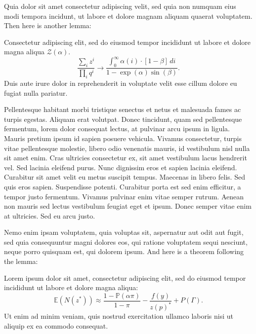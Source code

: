 \documentclass[letterpaper,11pt,leqno]{article}
\begin{document}
Quia dolor sit amet consectetur adipiscing velit, sed quia non numquam eius modi tempora incidunt, ut labore et dolore magnam aliquam quaerat voluptatem. Then here is another lemma:
\begin{lemma}
Consectetur adipiscing elit, sed do eiusmod tempor incididunt ut labore et dolore magna aliqua $\mathcal{Z}(\alpha)$. 
\begin{equation*}
\frac{\sum_i z^i}{\prod_i q^i} \to \frac{\int_{0}^{\infty} \alpha(i) \cdot [1-\beta]\,di}{1-\exp(\alpha)\sin(\beta)}.
\end{equation*}
Duis aute irure dolor in reprehenderit in voluptate velit esse cillum dolore eu fugiat nulla pariatur. 
\end{lemma}

Pellentesque habitant morbi tristique senectus et netus et malesuada fames ac turpis egestas. Aliquam erat volutpat. Donec tincidunt, quam sed pellentesque fermentum, lorem dolor consequat lectus, at pulvinar arcu ipsum in ligula. Mauris pretium ipsum id sapien posuere vehicula. Vivamus consectetur, turpis vitae pellentesque molestie, libero odio venenatis mauris, id vestibulum nisl nulla sit amet enim. Cras ultricies consectetur ex, sit amet vestibulum lacus hendrerit vel. Sed lacinia eleifend purus. Nunc dignissim eros et sapien lacinia eleifend. Curabitur sit amet velit eu metus suscipit tempus. Maecenas in libero felis. Sed quis eros sapien. Suspendisse potenti. Curabitur porta est sed enim efficitur, a tempor justo fermentum. Vivamus pulvinar enim vitae semper rutrum. Aenean non mauris sed lectus vestibulum feugiat eget et ipsum. Donec semper vitae enim at ultricies. Sed eu arcu justo.

Nemo enim ipsam voluptatem, quia voluptas sit, aspernatur aut odit aut fugit, sed quia consequuntur magni dolores eos, qui ratione voluptatem sequi nesciunt, neque porro quisquam est, qui dolorem ipsum. And here is a theorem following the lemma:
\begin{theorem} 
Lorem ipsum dolor sit amet, consectetur adipiscing elit, sed do eiusmod tempor incididunt ut labore et dolore magna aliqua:
\begin{equation*}
\mathbb{E}(N(z^*)) \approx \frac{1-\mathbb{P}(\alpha\pi)}{1-\pi}- \frac{f(y)}{z(p)^*} + P(\Gamma).
\end{equation*}
Ut enim ad minim veniam, quis nostrud exercitation ullamco laboris nisi ut aliquip ex ea commodo consequat.
\end{theorem}
\end{document}
